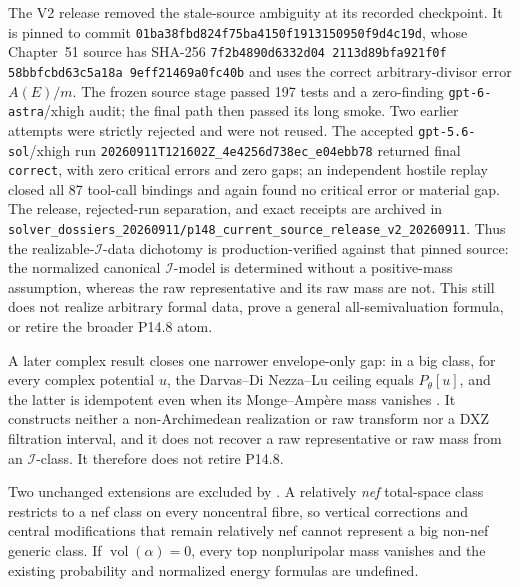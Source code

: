 The V2 release removed the stale-source ambiguity at its recorded
checkpoint.  It is pinned to commit
\nolinkurl{01ba38fbd824f75ba4150f1913150950f9d4c19d}, whose Chapter~51
source has SHA-256
\texttt{7f2b4890d6332d04\allowbreak
2113d89bfa921f0f\allowbreak
58bbfcbd63c5a18a\allowbreak
9eff21469a0fc40b}
and uses the correct arbitrary-divisor error \(A(E)/m\).  The frozen source
stage passed 197 tests and a zero-finding \texttt{gpt-6-astra}/xhigh audit;
the final path then passed its long smoke.  Two earlier attempts were
strictly rejected and were not reused.  The accepted
\texttt{gpt-5.6-sol}/xhigh run
\nolinkurl{20260911T121602Z_4e4256d738ec_e04ebb78} returned final
\texttt{correct}, with zero critical errors and zero gaps; an independent
hostile replay closed all 87 tool-call bindings and again found no critical
error or material gap.  The release, rejected-run separation, and exact
receipts are archived in
\nolinkurl{solver_dossiers_20260911/p148_current_source_release_v2_20260911}.
Thus the realizable-\(\mathcal I\)-data dichotomy is production-verified
against that pinned source: the normalized canonical \(\mathcal I\)-model is
determined without a positive-mass assumption, whereas the raw representative
and its raw mass are not.  This still does not realize arbitrary formal data,
prove a general all-semivaluation formula, or retire the broader P14.8 atom.

A later complex result closes one narrower envelope-only gap: in a big
class, for every complex potential \(u\), the Darvas--Di Nezza--Lu ceiling
equals \(P_\theta[u]\), and the latter is idempotent even when its
Monge--Amp\`ere mass vanishes \cite[Theorem~1.2]{PSWZ26}.  It constructs
neither a non-Archimedean realization or raw transform nor a DXZ
filtration interval, and it does not recover a raw representative or raw
mass from an \(\mathcal I\)-class.  It therefore does not retire P14.8.

Two unchanged extensions are excluded by
.
A relatively \emph{nef} total-space class restricts to a nef class on every
noncentral fibre, so vertical corrections and central modifications that
remain relatively nef cannot represent a big non-nef generic class.  If
\(\operatorname{vol}(\alpha)=0\), every top nonpluripolar mass vanishes and
the existing probability and normalized energy formulas are undefined.

